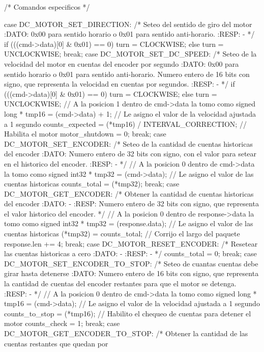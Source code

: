 {\begin{verbatimtab}
{{		/* Comandos especificos */

 		case DC_MOTOR_SET_DIRECTION:
			/* Seteo del sentido de giro del motor
			:DATO:
			0x00 para sentido horario o 0x01 para sentido anti-horario.
			:RESP:
			-
			*/
			if (((cmd->data)[0] & 0x01) == 0)
			{
				turn = CLOCKWISE;
			} else {
				turn = UNCLOCKWISE;
			}
		break;
 		case DC_MOTOR_SET_DC_SPEED:
			/* Seteo de la velocidad del motor en cuentas del encoder por segundo
			:DATO:
			0x00 para sentido horario o 0x01 para sentido anti-horario. Numero 
			entero de 16 bits con signo, que representa la velocidad en cuentas 
			por segundos.
			:RESP:
			-
			*/
			if (((cmd->data)[0] & 0x01) == 0)
			{
				turn = CLOCKWISE;
			} else {
				turn = UNCLOCKWISE;
			}
			// A la posicion 1 dentro de cmd->data la tomo como signed long *
			tmp16 = (cmd->data) + 1;
			// Le asigno el valor de la velocidad ajustada a 1 segundo
			counts_expected = (*tmp16) / INTERVAL_CORRECTION;
			// Habilita el motor
			motor_shutdown = 0;
		break;
 		case DC_MOTOR_SET_ENCODER:
			/* Seteo de la cantidad de cuentas historicas del encoder
			:DATO:
			Numero entero de 32 bits con signo, con el valor para setear en el
			historico del encoder.
			:RESP:
			-
			*/
			// A la posicion 0 dentro de cmd->data la tomo como signed int32 *
			tmp32 = (cmd->data);
			// Le asigno el valor de las cuentas historicas
			counts_total = (*tmp32);
		break;
 		case DC_MOTOR_GET_ENCODER:
			/* Obtener la cantidad de cuentas historicas del encoder
			:DATO:
			-
			:RESP:
			Numero entero de 32 bits con signo, que representa el valor historico
			del encoder.
			*/
			// A la posicion 0 dentro de response->data la tomo como signed int32 *
			tmp32 = (response.data);
			// Le asigno el valor de las cuentas historicas
			(*tmp32) = counts_total;
			// Corrijo el largo del paquete
			response.len += 4;
		break;
 		case DC_MOTOR_RESET_ENCODER:
			/* Resetear las cuentas historicas a cero
			:DATO:
			-
			:RESP:
			-
			*/
			counts_total = 0;
		break;
 		case DC_MOTOR_SET_ENCODER_TO_STOP:
			/* Seteo de cuantas cuentas debe girar hasta detenerse
			:DATO:
			Numero entero de 16 bits con signo, que representa la cantidad de
			cuentas del encoder restantes para que el motor se detenga.
			:RESP:
			-
			*/
			// A la posicion 0 dentro de cmd->data la tomo como signed long *
			tmp16 = (cmd->data);
			// Le asigno el valor de la velocidad ajustada a 1 segundo
			counts_to_stop = (*tmp16);
			// Habilito el chequeo de cuentas para detener el motor
			counts_check = 1;
		break;
 		case DC_MOTOR_GET_ENCODER_TO_STOP:
			/* Obtener la cantidad de las cuentas restantes que quedan por 
}}
\end{verbatimtab}}
